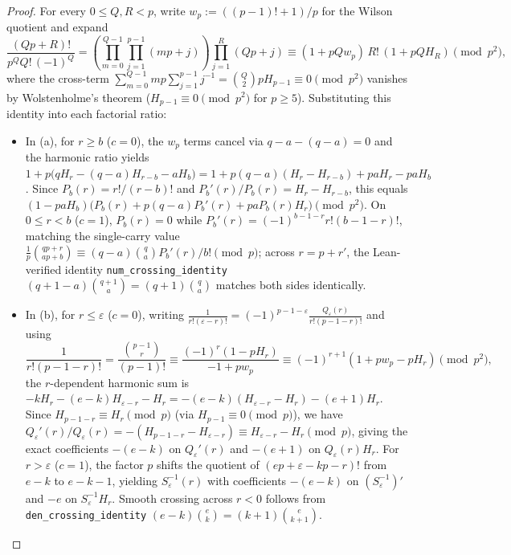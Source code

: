\documentclass[11pt,reqno]{amsart}
\theoremstyle{definition}
\theoremstyle{remark}
\begin{document}
\begin{proof}
For every $0 \le Q, R < p$, write $w_p := ((p-1)! + 1)/p$ for the Wilson quotient and expand
\[
  \frac{(Qp + R)!}{p^Q Q!\, (-1)^Q}
  = \left(\prod_{m=0}^{Q-1} \prod_{j=1}^{p-1}(mp + j)\right) \prod_{j=1}^{R}(Qp + j)
  \equiv (1 + p Q w_p)\, R!\, (1 + p Q H_R) \pmod{p^2},
\]
where the cross-term $\sum_{m=0}^{Q-1} m p \sum_{j=1}^{p-1} j^{-1} = \binom{Q}{2} p H_{p-1} \equiv 0 \pmod{p^2}$ vanishes by Wolstenholme's theorem ($H_{p-1} \equiv 0 \pmod{p^2}$ for $p \ge 5$). Substituting this identity into each factorial ratio:
\begin{itemize}
  \item In (a), for $r \ge b$ ($c = 0$), the $w_p$ terms cancel via $q - a - (q - a) = 0$ and the harmonic ratio yields $1 + p\bigl(q H_r - (q-a) H_{r-b} - a H_b\bigr) = 1 + p(q-a)(H_r - H_{r-b}) + p a H_r - p a H_b$. Since $P_b(r) = r!/(r-b)!$ and $P_b'(r)/P_b(r) = H_r - H_{r-b}$, this equals $(1 - p a H_b)\bigl(P_b(r) + p(q-a)P_b'(r) + p a P_b(r) H_r\bigr) \pmod{p^2}$. On $0 \le r < b$ ($c = 1$), $P_b(r) = 0$ while $P_b'(r) = (-1)^{b-1-r} r!(b-1-r)!$, matching the single-carry value $\frac{1}{p}\binom{qp+r}{ap+b} \equiv (q - a)\binom{q}{a} P_b'(r)/b! \pmod p$; across $r = p + r'$, the Lean-verified identity \texttt{num\_crossing\_identity} $(q+1-a)\binom{q+1}{a} = (q+1)\binom{q}{a}$ matches both sides identically.
  \item In (b), for $r \le \varepsilon$ ($c = 0$), writing $\frac{1}{r!(\varepsilon-r)!} = (-1)^{p-1-\varepsilon}\frac{Q_\varepsilon(r)}{r!(p-1-r)!}$ and using
  \[
    \frac{1}{r!(p-1-r)!} = \frac{\binom{p-1}{r}}{(p-1)!}
    \equiv \frac{(-1)^r(1 - p H_r)}{-1 + p w_p}
    \equiv (-1)^{r+1}(1 + p w_p - p H_r) \pmod{p^2},
  \]
  the $r$-dependent harmonic sum is $-k H_r - (e-k)H_{\varepsilon-r} - H_r = -(e-k)(H_{\varepsilon-r} - H_r) - (e+1)H_r$. Since $H_{p-1-r} \equiv H_r \pmod p$ (via $H_{p-1} \equiv 0 \pmod p$), we have $Q_\varepsilon'(r)/Q_\varepsilon(r) = -(H_{p-1-r} - H_{\varepsilon-r}) \equiv H_{\varepsilon-r} - H_r \pmod p$, giving the exact coefficients $-(e-k)$ on $Q_\varepsilon'(r)$ and $-(e+1)$ on $Q_\varepsilon(r) H_r$. For $r > \varepsilon$ ($c = 1$), the factor $p$ shifts the quotient of $(ep+\varepsilon-kp-r)!$ from $e-k$ to $e-k-1$, yielding $S_\varepsilon^{-1}(r)$ with coefficients $-(e-k)$ on $(S_\varepsilon^{-1})'$ and $-e$ on $S_\varepsilon^{-1} H_r$. Smooth crossing across $r < 0$ follows from \texttt{den\_crossing\_identity} $(e - k)\binom{e}{k} = (k+1)\binom{e}{k+1}$.

\end{itemize}
\end{proof}
\end{document}
